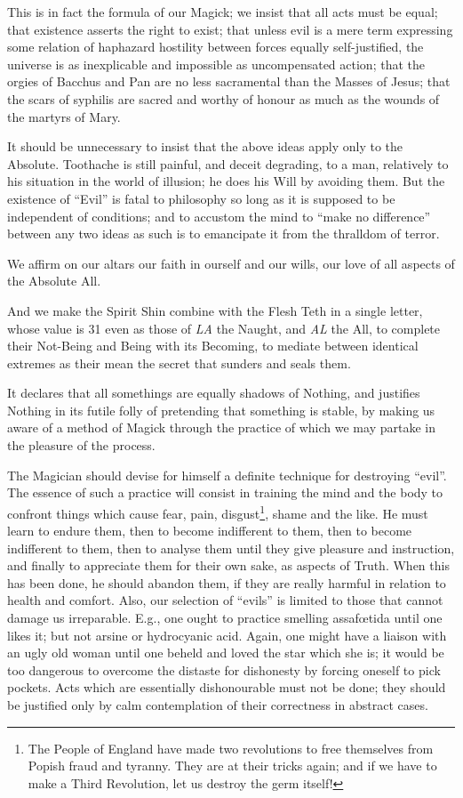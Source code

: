 This is in fact the formula of our Magick; we insist that all acts must be equal; that existence asserts the right to exist; that unless evil is a mere term expressing some relation of haphazard hostility between forces equally self-justified, the universe is as inexplicable and impossible as uncompensated action; that the orgies of Bacchus and Pan are no less sacramental than the Masses of Jesus; that the scars of syphilis are sacred and worthy of honour as much as the wounds of the martyrs of Mary.

It should be unnecessary to insist that the above ideas apply only to the Absolute. Toothache is still painful, and deceit degrading, to a man, relatively to his situation in the world of illusion; he does his Will by avoiding them. But the existence of \enquote{Evil} is fatal to philosophy so long as it is supposed to be independent of conditions; and to accustom the mind to \enquote{make no difference} between any two ideas as such is to emancipate it from the thralldom of terror.

We affirm on our altars our faith in ourself and our wills, our love of all aspects of the Absolute All.

And we make the Spirit Shin combine with the Flesh Teth in a single letter, whose value is 31 even as those of \textit{LA} the Naught, and \textit{AL} the All, to complete their Not-Being and Being with its Becoming, to mediate between identical extremes as their mean \textemdash{} the secret that sunders and seals them.

It declares that all somethings are equally shadows of Nothing, and justifies Nothing in its futile folly of pretending that something is stable, by making us aware of a method of Magick through the practice of which we may partake in the pleasure of the process.

The Magician should devise for himself a definite technique for destroying \enquote{evil}. The essence of such a practice will consist in training the mind and the body to confront things which cause fear, pain, disgust\footnote{The People of England have made two revolutions to free themselves from Popish fraud and tyranny. They are at their tricks again; and if we have to make a Third Revolution, let us destroy the germ itself!}, shame and the like. He must learn to endure them, then to become indifferent to them, then to become indifferent to them, then to analyse them until they give pleasure and instruction, and finally to appreciate them for their own sake, as aspects of Truth. When this has been done, he should abandon them, if they are really harmful in relation to health and comfort. Also, our selection of \enquote{evils} is limited to those that cannot damage us irreparable. E.g., one ought to practice smelling assaf\oe{}tida until one likes it; but not arsine or hydrocyanic acid. Again, one might have a liaison with an ugly old woman until one beheld and loved the star which she is; it would be too dangerous to overcome the distaste for dishonesty by forcing oneself to pick pockets. Acts which are essentially dishonourable must not be done; they should be justified only by calm contemplation of their correctness in abstract cases.

